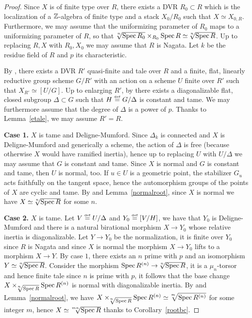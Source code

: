 \documentclass{amsart}
\numberwithin{equation}{section}
\numberwithin{subsection}{section}
\theoremstyle{definition}
\theoremstyle{remark}
\newcommand{\eqdef}{\mathrel{\smash{\overset{\mathrm{\scriptscriptstyle def}} =}}}
\newcommand\spec{\operatorname{Spec}}
\newcommand\radice[2][\relax]{\hspace{-1.5pt}\sqrt[\uproot{2}#1]{#2}}
\begin{document}
\begin{proof}
	Since $X$ is of finite type over $R$, there exists a DVR $R_{0}\subset R$ which is the localization of a $\mathbb{Z}$-algebra of finite type and a stack $X_{0}/R_{0}$ such that $X\simeq X_{0,R}$. Furthermore, we may assume that the uniformizing parameter of $R_{0}$ maps to a uniformizing parameter of $R$, so that $\radice[n]{\spec R_{0}}\times_{R_{0}}\spec R\simeq\radice[n]{\spec R}$. Up to replacing $R,X$ with $R_{0},X_{0}$ we may assume that $R$ is Nagata.	Let $k$ be the residue field of $R$ and $p$ its characteristic.
	
	By \cite[Theorem 3.2]{dan-olsson-vistoli1}, there exists a DVR $R'$ quasi-finite and tale over $R$ and a finite, flat, linearly reductive group scheme $G/R'$ with an action on a scheme $U$ finite over $R'$ such that $X_{R'}\simeq[U/G]$. Up to enlarging $R'$, by \cite[Lemma 2.20]{dan-olsson-vistoli1} there exists a diagonalizable flat, closed subgroup $\Delta\subset G$ such that $H\eqdef G/\Delta$ is constant and tame. We may furthermore assume that the degree of $\Delta$ is a power of $p$. Thanks to Lemma~\ref{etale}, we may assume $R'=R$.
	
	{\bf Case 1.} $X$ is tame and Deligne-Mumford. Since $\Delta_{k}$ is connected and $X$ is Deligne-Mumford and generically a scheme, the action of $\Delta$ is free (because otherwise $X$ would have ramified inertia), hence up to replacing $U$ with $U/\Delta$ we may assume that $G$ is constant and tame. Since $X$ is normal and $G$ is constant and tame, then $U$ is normal, too. If $u\in U$ is a geometric point, the stabilizer $G_{u}$ acts faithfully on the tangent space, hence the automorphism groups of the points of $X$ are cyclic and tame. By \cite[Lemma 8.5]{ryd11} and Lemma~\ref{normalroot}, since $X$ is normal we have $X\simeq\radice[n]{\spec R}$ for some $n$.
	
	{\bf Case 2.} $X$ is tame. Let $V\eqdef U/\Delta$ and $Y_{0}\eqdef [V/H]$, we have that $Y_{0}$ is Deligne-Mumford and there is a natural birational morphism $X\to Y_{0}$ whose relative inertia is diagonalizable. Let $Y\to Y_{0}$ be the normalization, it is finite over $Y_{0}$ since $R$ is Nagata and since $X$ is normal the morphism $X\to Y_{0}$ lifts to a morphism $X\to Y$. By case $1$, there exists an $n$ prime with $p$ and an isomorphism $Y\simeq\radice[n]{\spec R}$. Consider the morphism $\spec R^{(n)}\to\radice[n]{\spec R}$, it is a $\mu_{n}$-torsor and hence finite tale since $n$ is prime with $p$, it follows that the base change $X\times_{\radice[n]{\spec R}}\spec R^{(n)}$ is normal with diagonalizable inertia. By \cite[Lemma 8.5]{ryd11} and Lemma~\ref{normalroot}, we have $X\times_{\radice[n]{\spec R}}\spec R^{(n)}\simeq \radice[m]{\spec R^{(n)}}$ for some integer $m$, hence $X\simeq\radice[mn]{\spec R}$ thanks to Corollary~\ref{rootbc}. 
\end{proof}
\end{document}
